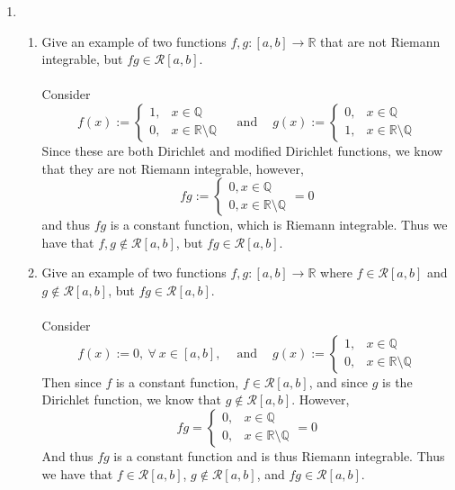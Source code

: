 \documentclass[12pt,letterpaper]{article}
\newcommand{\R}{\mathbb{R}}
\newcommand{\Q}{\mathbb{Q}}
\theoremstyle{case}
\theoremstyle{definition}
\begin{document}
\begin{enumerate}
		\item
		\begin{enumerate}
			\item Give an example of two functions $f,g:[a,b] \to \R$ that are not Riemann integrable, but $fg \in \mathcal{R}[a,b]$.
			\\\\Consider 
			\[f(x):=\begin{cases}
			1, &x \in \Q \\
			0, &x \in \R\setminus\Q
			\end{cases}\ \ \ \ \text{  and  }\ \ \ \ g(x):=\begin{cases}
			0, &x \in \Q \\
			1, &x \in \R\setminus\Q
			\end{cases}\]
			Since these are both Dirichlet and modified Dirichlet functions, we know that they are not Riemann integrable, however,
			\[fg:=\begin{cases}
			0, x \in \Q \\
			0, x \in \R\setminus\Q
			\end{cases}=0\]
			and thus $fg$ is a constant function, which is Riemann integrable. Thus we have that $f,g \notin \mathcal{R}[a,b]$, but $fg \in \mathcal{R}[a,b]$.\\
			\item Give an example of two functions $f,g:[a,b] \to \R$ where $f \in \mathcal{R}[a,b]$ and $g \notin \mathcal{R}[a,b]$, but $fg \in \mathcal{R}[a,b]$.\\\\
			Consider
			\[f(x):=0,\ \forall\ x \in [a,b],\ \ \ \ \text{  and  }\ \ \ \ g(x):=\begin{cases}
			1, &x \in \Q \\
			0, &x \in \R\setminus\Q
			\end{cases}\]
			Then since $f$ is a constant function, $f \in \mathcal{R}[a,b]$, and since $g$ is the Dirichlet function, we know that $g \notin \mathcal{R}[a,b]$. However,
			\[fg=\begin{cases}
			0, &x \in \Q \\
			0, &x \in \R\setminus\Q
			\end{cases}=0\]
			And thus $fg$ is a constant function and is thus Riemann integrable. Thus we have that $f \in \mathcal{R}[a,b]$, $g \notin \mathcal{R}[a,b]$, and $fg \in \mathcal{R}[a,b]$.\\

\end{enumerate}
\end{enumerate}
\end{document}
